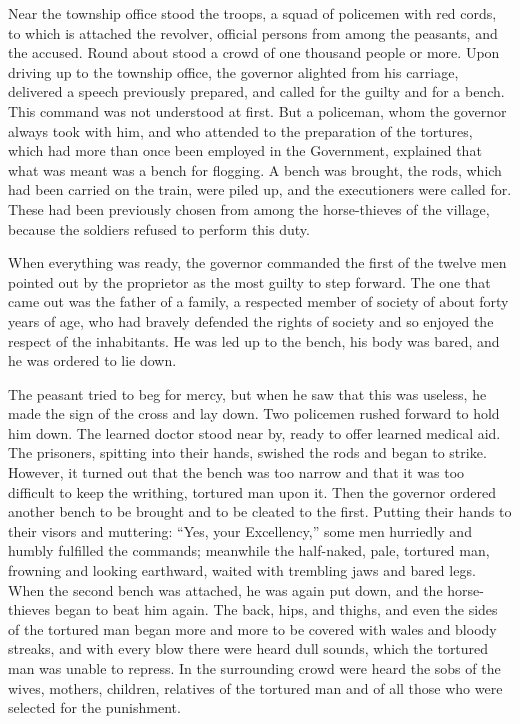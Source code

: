 \documentclass{book}
\begin{document}
Near the township office stood the troops, a squad of policemen with red cords, to which is attached the revolver, official persons from among the peasants, and the accused. Round about stood a crowd of one thousand people or more. Upon driving up to the township office, the governor alighted from his carriage, delivered a speech previously prepared, and called for the guilty and for a bench. This command was not understood at first. But a policeman, whom the governor always took with him, and who attended to the preparation of the tortures, which had more than once been employed in the Government, explained that what was meant was a bench for flogging. A bench was brought, the rods, which had been carried on the train, were piled up, and the executioners were called for. These had been previously chosen from among the horse-thieves of the village, because the soldiers refused to perform this duty.

When everything was ready, the governor commanded the first of the twelve men pointed out by the proprietor as the most guilty to step forward. The one that came out was the father of a family, a respected member of society of about forty years of age, who had bravely defended the rights of society and so enjoyed the respect of the inhabitants. He was led up to the bench, his body was bared, and he was ordered to lie down.

The peasant tried to beg for mercy, but when he saw that this was useless, he made the sign of the cross and lay down. Two policemen rushed forward to hold him down. The learned doctor stood near by, ready to offer learned medical aid. The prisoners, spitting into their hands, swished the rods and began to strike. However, it turned out that the bench was too narrow and that it was too difficult to keep the writhing, tortured man upon it. Then the governor ordered another bench to be brought and to be cleated to the first. Putting their hands to their visors and muttering: “Yes, your Excellency,” some men hurriedly and humbly fulfilled the commands; meanwhile the half-naked, pale, tortured man, frowning and looking earthward, waited with trembling jaws and bared legs. When the second bench was attached, he was again put down, and the horse-thieves began to beat him again. The back, hips, and thighs, and even the sides of the tortured man began more and more to be covered with wales and bloody streaks, and with every blow there were heard dull sounds, which the tortured man was unable to repress. In the surrounding crowd were heard the sobs of the wives, mothers, children, relatives of the tortured man and of all those who were selected for the punishment.
\end{document}
